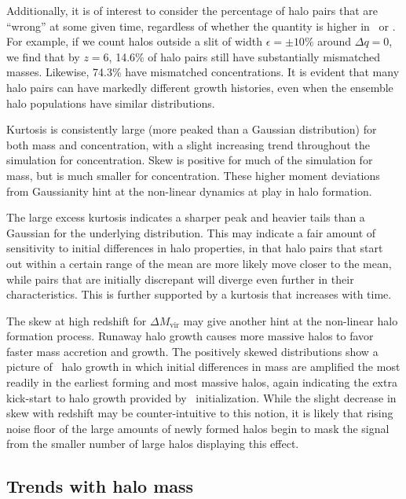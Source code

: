 Additionally, it is of interest to consider the percentage of halo pairs that are ``wrong'' at some given time, regardless of whether the quantity is higher in \lpt\ or \za.  For example, if we count halos outside a slit of width $\epsilon = \pm 10\%$ around $\Delta q = 0$, we find that by $z = 6$, 14.6\% of halo pairs still have substantially mismatched masses.  Likewise, 74.3\% have mismatched concentrations.  It is evident that many halo pairs can have markedly different growth histories, even when the ensemble halo populations have similar distributions.

Kurtosis is consistently large (more peaked than a Gaussian distribution) for both mass and concentration, with a slight increasing trend throughout the simulation for concentration.  Skew is positive for much of the simulation for mass, but is much smaller for concentration.  These higher moment deviations from Gaussianity hint at the non-linear dynamics at play in halo formation.

The large excess kurtosis indicates a sharper peak and heavier tails than a Gaussian for the underlying distribution.  This may indicate a fair amount of sensitivity to initial differences in halo properties, in that halo pairs that start out within a certain range of the mean are more likely move closer to the mean, while pairs that are initially discrepant will diverge even further in their characteristics.  This is further supported by a kurtosis that increases with time.

The skew at high redshift for $\Delta M_{\mathrm{vir}}$ may give another hint at the non-linear halo formation process.  Runaway halo growth causes more massive halos to favor faster mass accretion and growth.  The positively skewed distributions show a picture of \lpt\ halo growth in which initial differences in mass are amplified the most readily in the earliest forming and most massive halos, again indicating the extra kick-start to halo growth provided by \lpt\ initialization.  While the slight decrease in skew with redshift may be counter-intuitive to this notion, it is likely that rising noise floor of the large amounts of newly formed halos begin to mask the signal from the smaller number of large halos displaying this effect.


\subsection{Trends with halo mass}

